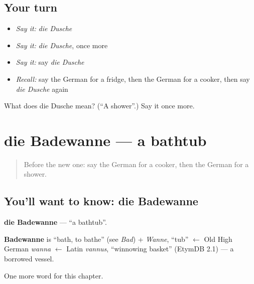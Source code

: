 \subsection*{Your turn}
\begin{itemize}
\raggedright
  \item \emph{Say it:} \emph{die Dusche}
  \item \emph{Say it:} \emph{die Dusche}, once more
  \item \emph{Say it:} say \emph{die Dusche}
  \item \emph{Recall:} say the German for a fridge, then the German for a cooker, then say \emph{die Dusche} again
\end{itemize}

\begin{tcolorbox}[breakable,colback=teal!4,colframe=teal!35!black,title={Before you move on}]
What does die Dusche mean? (\textquotedblleft{}A shower\textquotedblright{}.) Say it once more.
\end{tcolorbox}
\section[die Badewanne]{die Badewanne — a bathtub}

\label{lesson:GE-C113-badewanne}



\begin{quote}
Before the new one: say the German for a cooker, then the German for a shower.
\end{quote}

\subsection*{You'll want to know: die Badewanne}
\textbf{die Badewanne} — \textquotedblleft{}a bathtub\textquotedblright{}.

\begin{cousinweb}
\textbf{Badewanne} is \textquotedblleft{}bath, to bathe\textquotedblright{} (see \emph{Bad}) + \emph{Wanne}, \textquotedblleft{}tub\textquotedblright{} $\leftarrow$ Old High German \emph{wanna} $\leftarrow$ Latin \emph{vannus}, \textquotedblleft{}winnowing basket\textquotedblright{} (EtymDB 2.1) — a borrowed vessel.
\end{cousinweb}

\begin{grammarlens}[title={What you've built}]
One more word for this chapter.
\end{grammarlens}

